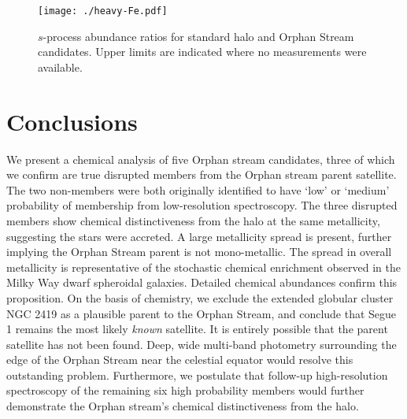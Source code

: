 \documentclass{emulateapj}
\begin{document}











\begin{figure}[h]
	\texttt{[image: ./heavy-Fe.pdf]}
	\caption{$s$-process abundance ratios for standard halo and Orphan Stream candidates. Upper limits are indicated where no measurements were available.}
	\label{fig:heavy-fe}
\end{figure}





\section{Conclusions}
\label{sec:conclusions}

We present a chemical analysis of five Orphan stream candidates, three of which we confirm are true disrupted members from the Orphan stream parent satellite. The two non-members were both originally identified to have `low' or `medium' probability of membership from low-resolution spectroscopy. The three disrupted members show chemical distinctiveness from the halo at the same metallicity, suggesting the stars were accreted. A large metallicity spread is present, further implying the Orphan Stream parent is not mono-metallic. The spread in overall metallicity is representative of the stochastic chemical enrichment observed in the Milky Way dwarf spheroidal galaxies. Detailed chemical abundances confirm this proposition. On the basis of chemistry, we exclude the extended globular cluster NGC 2419 as a plausible parent to the Orphan Stream, and conclude that Segue 1 remains the most likely {\it known} satellite. It is entirely possible that the parent satellite has not been found. Deep, wide multi-band photometry surrounding the edge of the Orphan Stream near the celestial equator would resolve this outstanding problem. Furthermore, we postulate that follow-up high-resolution spectroscopy of the remaining six high probability members would further demonstrate the Orphan stream's chemical distinctiveness from the halo.
\end{document}

